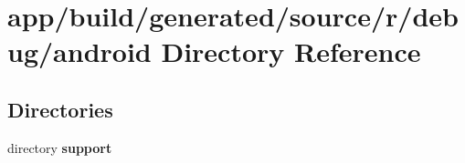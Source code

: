 \section{app/build/generated/source/r/debug/android Directory Reference}
\label{dir_25ce7ee25446ff994833a72f361d8438}
\subsection*{Directories}
\begin{DoxyCompactItemize}
\item 
directory {\bf support}
\end{DoxyCompactItemize}
